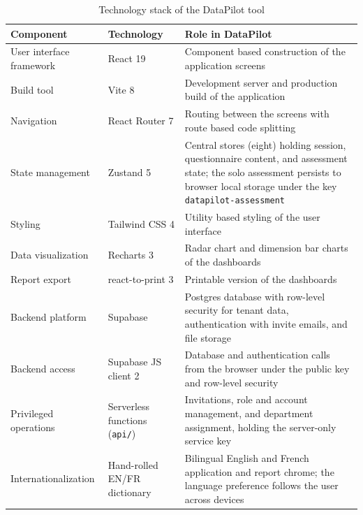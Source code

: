 \begin{table}[H]
\centering
\caption{Technology stack of the DataPilot tool} \label{tab:tech-stack}

\footnotesize
\setlength{\tabcolsep}{4pt}
\begin{tabular}{|p{3.4cm}|p{3.2cm}|p{7.6cm}|}
\hline
\textbf{Component} & \textbf{Technology} & \textbf{Role in DataPilot} \\
\hline
User interface framework & React 19 & Component based construction of the application screens \\
\hline
Build tool & Vite 8 & Development server and production build of the application \\
\hline
Navigation & React Router 7 & Routing between the screens with route based code splitting \\
\hline
State management & Zustand 5 & Central stores (eight) holding session, questionnaire content, and assessment state; the solo assessment persists to browser local storage under the key \texttt{datapilot-assessment} \\
\hline
Styling & Tailwind CSS 4 & Utility based styling of the user interface \\
\hline
Data visualization & Recharts 3 & Radar chart and dimension bar charts of the dashboards \\
\hline
Report export & react-to-print 3 & Printable version of the dashboards \\
\hline
Backend platform & Supabase & Postgres database with row-level security for tenant data, authentication with invite emails, and file storage \\
\hline
Backend access & Supabase JS client 2 & Database and authentication calls from the browser under the public key and row-level security \\
\hline
Privileged operations & Serverless functions (\texttt{api/}) & Invitations, role and account management, and department assignment, holding the server-only service key \\
\hline
Internationalization & Hand-rolled EN/FR dictionary & Bilingual English and French application and report chrome; the language preference follows the user across devices \\
\hline
\end{tabular}

\end{table}

